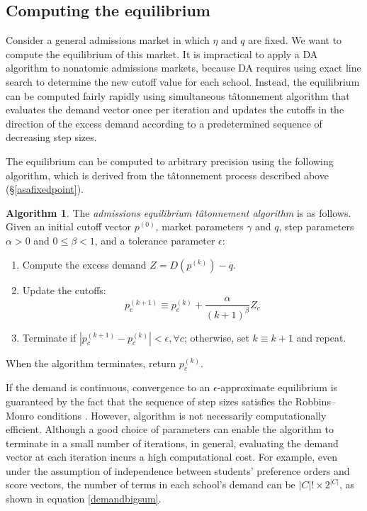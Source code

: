 \documentclass[12pt]{article}
\theoremstyle{definition}
\newtheorem{algorithm}{Algorithm}
\begin{document}
\subsection{Computing the equilibrium} \label{computingtheeq}
Consider a general admissions market in which $\eta$ and $q$ are fixed. We want to compute the equilibrium of this market. It is impractical to apply a DA algorithm to nonatomic admissions markets, because DA requires using exact line search to determine the new cutoff value for each school. Instead, the equilibrium can be computed fairly rapidly using simultaneous t\^{a}tonnement algorithm that evaluates the demand vector once per iteration and updates the cutoffs in the direction of the excess demand according to a predetermined sequence of decreasing step sizes.

The equilibrium can be computed to arbitrary precision using the following algorithm, which is derived from the t\^{a}tonnement process described above (\S\ref{asafixedpoint}). 
\begin{algorithm} \label{admissionseqtatalgo}
The \emph{admissions equilibrium t\^{a}tonnement algorithm} is as follows. Given an initial cutoff vector $p^{(0)}$, market parameters $\gamma$ and $q$, step parameters $\alpha >0$ and $0 \leq \beta < 1$, and a tolerance parameter $\epsilon$:
\begin{enumerate}
\item Compute the excess demand $Z = D (p^{(k)}) - q$. 
\item Update the cutoffs:
\[ p_c^{(k+1)} \equiv p_c^{(k)} + \frac{\alpha}{(k+1)^\beta} Z_c\]
\item Terminate if $| p_c^{(k+1)} - p_c^{(k)} | < \epsilon, \forall c$; otherwise, set $k \equiv k+1$ and repeat. 
\end{enumerate}
When the algorithm terminates, return $p_c^{(k)}$. 
\end{algorithm}
If the demand is continuous, convergence to an $\epsilon$-approximate equilibrium is guaranteed by the fact that the sequence of step sizes satisfies the Robbins--Monro conditions \parencite[][]{robbinsmonro}. However, algorithm is not necessarily computationally efficient. Although a good choice of parameters can enable the algorithm to terminate in a small number of iterations, in general, evaluating the demand vector at each iteration incurs a high computational cost. For example, even under the assumption of independence between students' preference orders and score vectors, the number of terms in each school's demand can be $|C|! \times 2^{|C|}$, as shown in equation \eqref{demandbigsum}.
\end{document}
